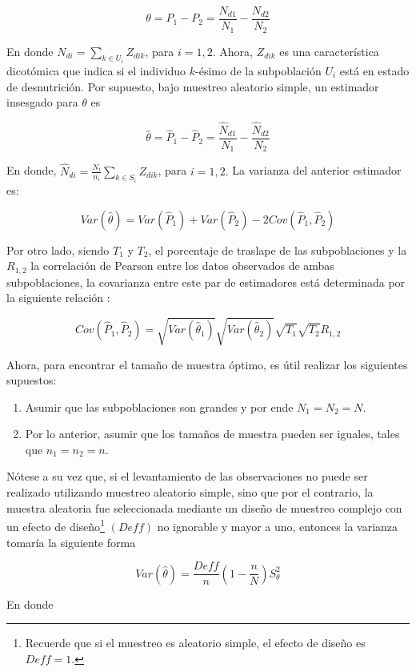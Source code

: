 \documentclass[
  10pt,
  spanish,
]{book}
\providecommand{\tightlist}{%
  \setlength{\itemsep}{0pt}\setlength{\parskip}{0pt}}
\begin{document}
\[
\theta=P_1-P_2=\frac{N_{d1}}{N_1}-\frac{N_{d2}}{N_2}
\]

En donde \(N_{di}=\sum_{k\in U_i}Z_{dik}\), para \(i=1,2.\) Ahora, \(Z_{dik}\) es una característica dicotómica que indica si el individuo \(k\)-ésimo de la subpoblación \(U_i\) está en estado de desnutrición. Por supuesto, bajo muestreo aleatorio simple, un estimador insesgado para \(\theta\) es

\[
\hat{\theta}=\hat{P}_1-\hat{P}_2=\frac{\hat{N}_{d1}}{N_1}-\frac{\hat{N}_{d2}}{N_2}
\]

En donde, \(\hat{N}_{di}=\frac{N_i}{n_i}\sum_{k\in S_i}Z_{dik}\), para \(i=1,2.\) La varianza del anterior estimador es:

\[
Var(\hat{\theta})=Var\left(\hat{P}_1\right)+Var\left(\hat{P}_2\right)-2Cov\left(\hat{P}_1, \hat{P}_2\right)
\]

Por otro lado, siendo \(T_1\) y \(T_2\), el porcentaje de traslape de las subpoblaciones y la \(R_{1,2}\) la correlación de Pearson entre los datos observados de ambas subpoblaciones, la covarianza entre este par de estimadores está determinada por la siguiente relación \citep{Kish_2004}:

\[
Cov(\hat{P}_1, \hat{P}_2) = \sqrt{Var(\hat{\theta}_1)}\sqrt{Var(\hat{\theta}_2)}\sqrt{T_1}\sqrt{T_2}R_{1,2}
\]

Ahora, para encontrar el tamaño de muestra óptimo, es útil realizar los siguientes supuestos:

\begin{enumerate}
\def\labelenumi{\arabic{enumi}.}
\tightlist
\item
  Asumir que las subpoblaciones son grandes y por ende \(N_1=N_2=N\).
\item
  Por lo anterior, asumir que los tamaños de muestra pueden ser iguales, tales que \(n_1=n_2=n\).
\end{enumerate}

Nótese a su vez que, si el levantamiento de las observaciones no puede ser realizado utilizando muestreo aleatorio simple, sino que por el contrario, la muestra aleatoria fue seleccionada mediante un diseño de muestreo complejo con un efecto de diseño\footnote{Recuerde que si el muestreo es aleatorio simple, el efecto de diseño es \(Deff=1\).} \((Deff)\) no ignorable y mayor a uno, entonces la varianza tomaría la siguiente forma

\[
Var(\hat{\theta})=\frac{Deff}{n}\left(1-\frac{n}{N}\right)S^2_{\theta}
\]

En donde
\end{document}
